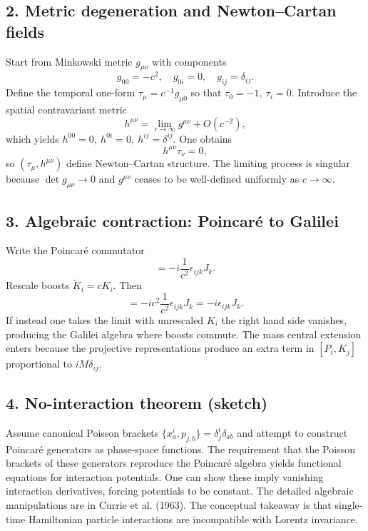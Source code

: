 \documentclass[12pt]{article}
\begin{document}
\subsection*{2. Metric degeneration and Newton--Cartan fields}
Start from Minkowski metric $g_{\mu\nu}$ with components
\begin{equation}
 g_{00} = -c^2, \quad g_{0i}=0, \quad g_{ij}=\delta_{ij}.
\end{equation}
Define the temporal one-form $\tau_\mu = c^{-1} g_{\mu 0}$ so that $\tau_0 = -1,\ \tau_i=0$. Introduce the spatial contravariant metric
\begin{equation}
 h^{\mu\nu} = \lim_{c\to\infty} g^{\mu\nu} + O(c^{-2}),
\end{equation}
which yields $h^{00}=0,\ h^{0i}=0,\ h^{ij}=\delta^{ij}$. One obtains
\begin{equation}
 h^{\mu\nu}\tau_\nu = 0,
\end{equation}
so $(\tau_\mu,h^{\mu\nu})$ define Newton--Cartan structure. The limiting process is singular because $\det g_{\mu\nu}\to0$ and $g^{\mu\nu}$ ceases to be well-defined uniformly as $c\to\infty$.

\subsection*{3. Algebraic contraction: Poincar\'e to Galilei}
Write the Poincar\'e commutator
\begin{equation}
 [K_i,K_j] = -i\frac{1}{c^2} \epsilon_{ijk} J_k.
\end{equation}
Rescale boosts $\tilde K_i = c K_i$. Then
\begin{equation}
 [\tilde K_i,\tilde K_j] = -i c^2 \frac{1}{c^2} \epsilon_{ijk} J_k = -i \epsilon_{ijk} J_k.
\end{equation}
If instead one takes the limit with unrescaled $K_i$ the right hand side vanishes, producing the Galilei algebra where boosts commute. The mass central extension enters because the projective representations produce an extra term in $[P_i, K_j]$ proportional to $i M \delta_{ij}$.

\subsection*{4. No-interaction theorem (sketch)}
Assume canonical Poisson brackets $\{x^i_a,p_{j,b}\} = \delta^i_j \delta_{ab}$ and attempt to construct Poincar\'e generators as phase-space functions. The requirement that the Poisson brackets of these generators reproduce the Poincar\'e algebra yields functional equations for interaction potentials. One can show these imply vanishing interaction derivatives, forcing potentials to be constant. The detailed algebraic manipulations are in Currie et al. (1963). The conceptual takeaway is that single-time Hamiltonian particle interactions are incompatible with Lorentz invariance.
\end{document}

